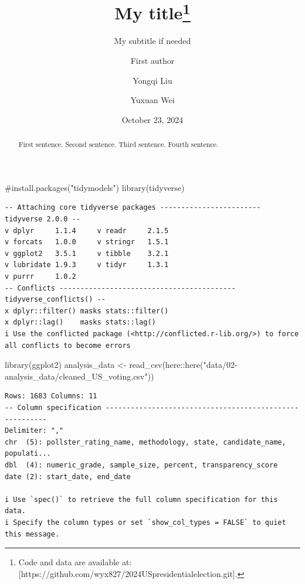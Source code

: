 \documentclass[
  letterpaper,
  DIV=11,
  numbers=noendperiod]{scrartcl}
\title{My title\thanks{Code and data are available at:
{[}https://github.com/wyx827/2024USpresidentialelection.git{]}.}}
\subtitle{My subtitle if needed}
\author{First author \and Yongqi Liu \and Yuxuan Wei}
\date{October 23, 2024}
\newenvironment{Shaded}{\begin{snugshade}}{\end{snugshade}}
\newcommand{\CommentTok}[1]{\textcolor[rgb]{0.37,0.37,0.37}{#1}}
\newcommand{\FunctionTok}[1]{\textcolor[rgb]{0.28,0.35,0.67}{#1}}
\newcommand{\NormalTok}[1]{\textcolor[rgb]{0.00,0.23,0.31}{#1}}
\newcommand{\OtherTok}[1]{\textcolor[rgb]{0.00,0.23,0.31}{#1}}
\newcommand{\SpecialCharTok}[1]{\textcolor[rgb]{0.37,0.37,0.37}{#1}}
\newcommand{\StringTok}[1]{\textcolor[rgb]{0.13,0.47,0.30}{#1}}
\begin{document}
\maketitle
\begin{abstract}
First sentence. Second sentence. Third sentence. Fourth sentence.
\end{abstract}


\begin{Shaded}
\begin{Highlighting}[]
\CommentTok{\#install.packages("tidymodels")}
\FunctionTok{library}\NormalTok{(tidyverse)}
\end{Highlighting}
\end{Shaded}

\begin{verbatim}
-- Attaching core tidyverse packages ------------------------ tidyverse 2.0.0 --
v dplyr     1.1.4     v readr     2.1.5
v forcats   1.0.0     v stringr   1.5.1
v ggplot2   3.5.1     v tibble    3.2.1
v lubridate 1.9.3     v tidyr     1.3.1
v purrr     1.0.2     
-- Conflicts ------------------------------------------ tidyverse_conflicts() --
x dplyr::filter() masks stats::filter()
x dplyr::lag()    masks stats::lag()
i Use the conflicted package (<http://conflicted.r-lib.org/>) to force all conflicts to become errors
\end{verbatim}

\begin{Shaded}
\begin{Highlighting}[]
\FunctionTok{library}\NormalTok{(ggplot2)}
\NormalTok{analysis\_data }\OtherTok{\textless{}{-}} \FunctionTok{read\_csv}\NormalTok{(here}\SpecialCharTok{::}\FunctionTok{here}\NormalTok{(}\StringTok{"data/02{-}analysis\_data/cleaned\_US\_voting.csv"}\NormalTok{))}
\end{Highlighting}
\end{Shaded}

\begin{verbatim}
Rows: 1683 Columns: 11
-- Column specification --------------------------------------------------------
Delimiter: ","
chr  (5): pollster_rating_name, methodology, state, candidate_name, populati...
dbl  (4): numeric_grade, sample_size, percent, transparency_score
date (2): start_date, end_date

i Use `spec()` to retrieve the full column specification for this data.
i Specify the column types or set `show_col_types = FALSE` to quiet this message.
\end{verbatim}
\end{document}
